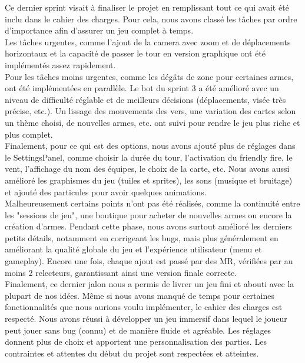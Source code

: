 \documentclass[a4paper, 12pt]{article}
\begin{document}
\begin{itemize}[itemsep=1cm]
                Ce dernier sprint visait à finaliser le projet en remplissant tout ce qui avait été inclu dans le cahier des charges.
                Pour cela, nous avons classé les tâches par ordre d'importance afin d'assurer un jeu complet à temps.\\

                Les tâches urgentes, comme l’ajout de la camera avec zoom et de déplacements horizontaux et la capacité de passer le tour en version graphique ont été implémentés assez rapidement.\\
                
                Pour les tâches moins urgentes, comme les dégâts de zone pour certaines armes, ont été implémentées en parallèle.
                Le bot du sprint 3 a été amélioré avec un niveau de difficulté réglable et de meilleurs décisions (déplacements, visée très précise, etc.).
                Un lissage des mouvements des vers, une variation des cartes selon un thème choisi, de nouvelles armes, etc. ont suivi pour rendre le jeu plus riche et plus complet.\\

                Finalement, pour ce qui est des options, nous avons ajouté plus de réglages dans le SettingsPanel, comme choisir la durée du tour, l'activation du friendly fire, le vent, l'affichage du nom des équipes, le choix de la carte, etc.
                Nous avons aussi amélioré les graphismes du jeu (tuiles et sprites), les sons (musique et bruitage) et ajouté des particules pour avoir quelques animations.\\

                Malheureusement certains points n'ont pas été réalisés, comme la continuité entre les "sessions de jeu", une boutique pour acheter de nouvelles armes ou encore la création d'armes.
                Pendant cette phase, nous avons surtout amélioré les derniers petits détails, notamment en corrigeant les bugs, mais plus généralement en améliorant la qualité globale du jeu et l'expérience utilisateur (menu et gameplay).
                Encore une fois, chaque ajout est passé par des MR, vérifiées par au moins 2 relecteurs, garantissant ainsi une version finale correcte.\\

                Finalement, ce dernier jalon nous a permis de livrer un jeu fini et abouti avec la plupart de nos idées.
                Même si nous avons manqué de temps pour certaines fonctionnalités que nous aurions voulu implémenter, le cahier des charges est respecté.
                Nous avons réussi à développer un jeu immersif dans lequel le joueur peut jouer sans bug (connu) et de manière fluide et agréable.
                Les réglages donnent plus de choix et apportent une personnalisation des parties.
                Les contraintes et attentes du début du projet sont respectées et atteintes.


        \end{itemize}
\end{document}
